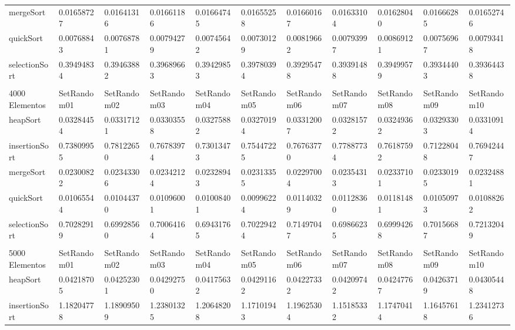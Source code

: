 \documentclass[article,a4paper]{article}
\begin{document}
\begin{table}[h]
{\begin{tabular}{lllllllllll}
mergeSort       & 0.01658727  & 0.01641316  & 0.01661186  & 0.01664745  & 0.01655258  & 0.01660167  & 0.01633104  & 0.01628040  & 0.01666285  & 0.01652746  \\
quickSort       & 0.00768843  & 0.00768781  & 0.00794279  & 0.00745642  & 0.00730129  & 0.00819662  & 0.00793997  & 0.00869121  & 0.00756967  & 0.00793418  \\
selectionSort   & 0.39494834  & 0.39463882  & 0.39689663  & 0.39429853  & 0.39780394  & 0.39295478  & 0.39391488  & 0.39499579  & 0.39344403  & 0.39364438  \\
                &             &             &             &             &             &             &             &             &             &             \\
4000 Elementos  & SetRandom01 & SetRandom02 & SetRandom03 & SetRandom04 & SetRandom05 & SetRandom06 & SetRandom07 & SetRandom08 & SetRandom09 & SetRandom10 \\
heapSort        & 0.03284454  & 0.03317121  & 0.03303558  & 0.03275882  & 0.03270194  & 0.03312007  & 0.03281572  & 0.03249362  & 0.03293303  & 0.03310914  \\
insertionSort   & 0.73809955  & 0.78122650  & 0.76783974  & 0.73013473  & 0.75447225  & 0.76763770  & 0.77887734  & 0.76187592  & 0.71228048  & 0.76942447  \\
mergeSort       & 0.02300822  & 0.02343306  & 0.02342124  & 0.02328943  & 0.02313355  & 0.02297004  & 0.02354313  & 0.02337101  & 0.02330195  & 0.02324881  \\
quickSort       & 0.01065544  & 0.01044370  & 0.01096001  & 0.01008401  & 0.00996224  & 0.01140329  & 0.01128360  & 0.01181481  & 0.01050973  & 0.01088262  \\
selectionSort   & 0.70282919  & 0.69928560  & 0.70064164  & 0.69431765  & 0.70229424  & 0.71497047  & 0.69866235  & 0.69994268  & 0.70156687  & 0.72132049  \\
                &             &             &             &             &             &             &             &             &             &             \\
5000 Elementos  & SetRandom01 & SetRandom02 & SetRandom03 & SetRandom04 & SetRandom05 & SetRandom06 & SetRandom07 & SetRandom08 & SetRandom09 & SetRandom10 \\
heapSort        & 0.04218705  & 0.04252301  & 0.04292750  & 0.04175632  & 0.04291162  & 0.04227332  & 0.04209742  & 0.04247767  & 0.04263719  & 0.04305448  \\
insertionSort   & 1.18204778  & 1.18909509  & 1.23801325  & 1.20648208  & 1.17101943  & 1.19625304  & 1.15185332  & 1.17470414  & 1.16457618  & 1.23412736  \\

\end{tabular}}
\end{table}
\end{document}
